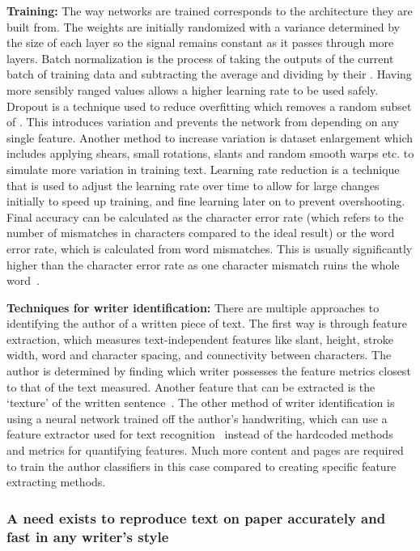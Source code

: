 \textbf{Training:} The way networks are trained corresponds to the architecture they are built from. The weights are initially randomized with a variance determined by the size of each layer so the signal remains constant as it passes through more layers. Batch normalization is the process of taking the outputs of the current batch of training data and subtracting the average and dividing by their . Having more sensibly ranged values allows a higher learning rate to be used safely. Dropout is a technique used to reduce overfitting which removes a random subset of . This introduces variation and prevents the network from depending on any single feature. Another method to increase variation is dataset enlargement which includes applying shears, small rotations, slants and random smooth warps etc. to simulate more variation in training text. Learning rate reduction is a technique that is used to adjust the learning rate over time to allow for large changes initially to speed up training, and fine learning later on to prevent overshooting. Final accuracy can be calculated as the character error rate (which refers to the number of mismatches in characters compared to the ideal result) or the word error rate, which is calculated from word mismatches. This is usually significantly higher than the character error rate as one character mismatch ruins the whole word~\cite{chen2023}.

\textbf{Techniques for writer identification:} There are multiple approaches to identifying the author of a written piece of text. The first way is through feature extraction, which measures text-independent features like slant, height, stroke width, word and character spacing, and connectivity between characters. The author is determined by finding which writer possesses the feature metrics closest to that of the text measured. Another feature that can be extracted is the  `texture' of the written sentence~\cite{bulacu2007}. The other method of writer identification is using a neural network trained off the author's handwriting, which can use a feature extractor used for text recognition~\cite{ma2023} instead of the hardcoded methods and metrics for quantifying features. Much more content and pages are required to train the author classifiers in this case compared to creating specific feature extracting methods.

\subsubsection{A need exists to reproduce text on paper accurately and fast in any writer's style}
\label{sec:lit-synth}

